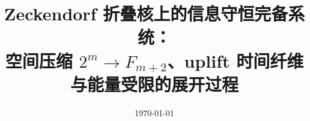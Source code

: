 \documentclass[11pt,letterpaper]{ctexart}
\title{Zeckendorf 折叠核上的信息守恒完备系统：\\空间压缩 $2^m\to F_{m+2}$、uplift 时间纤维与能量受限的展开过程}
\author{}
\date{\today}
\begin{document}
\maketitle









\FloatBarrier
\appendix


\FloatBarrier

\end{document}
